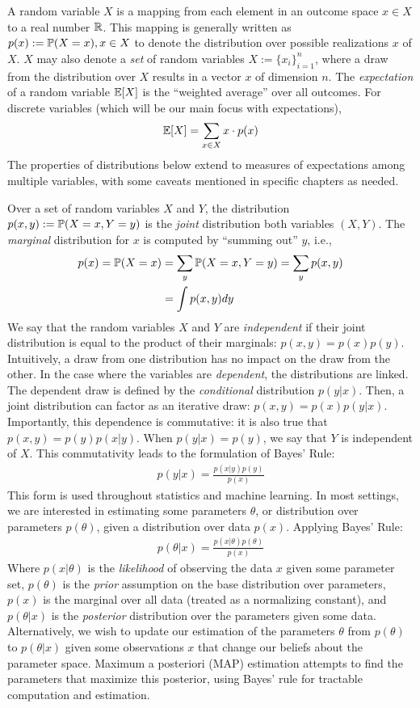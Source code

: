 
A random variable $X$ is a mapping from each element in an outcome space $x \in X$ to a real number $\mathbb{R}$. This mapping is generally written as $p(x):=\mathbb{P}(X=x), x \in X$ to denote the distribution over possible realizations $x$ of $X$. $X$ may also denote a \textit{set} of random variables $X:=\{x_i\}_{i=1}^n$, where a draw from the distribution over $X$ results in a vector $x$ of dimension $n$.
The \textit{expectation} of a random variable $\mathbb{E}[X]$ is the ``weighted average'' over all outcomes. For discrete variables (which will be our main focus with expectations), 
\begin{align}
\mathbb{E}[X] = \sum_{x\in X} x\cdot p(x)
\end{align}
The properties of distributions below extend to measures of expectations among multiple variables, with some caveats mentioned in specific chapters as needed.

Over a set of random variables $X$ and $Y$, the distribution $p(x,y):= \mathbb{P}(X=x,Y=y)$ is the \textit{joint} distribution both variables $(X,Y)$. The \textit{marginal} distribution for $x$ is computed by ``summing out'' $y$, i.e.,
\begin{align}
p(x) = \mathbb{P}(X=x) &= \sum_y \mathbb{P}(X=x,Y=y) = \sum_y p(x,y) \\
&= \int p(x,y) dy
\end{align}
We say that the random variables $X$ and $Y$ are \textit{independent} if their joint distribution is equal to the product of their marginals: $p(x,y) = p(x)p(y)$.
Intuitively, a draw from one distribution has no impact on the draw from the other. In the case where the variables are \textit{dependent}, the distributions are linked. The dependent draw is defined by the \textit{conditional} distribution $p(y|x)$. Then, a joint distribution can factor as an iterative draw: $p(x,y) = p(x)p(y|x)$. Importantly, this dependence is commutative: it is also true that $p(x,y) = p(y)p(x|y)$. When $p(y|x) = p(y)$, we say that $Y$ is independent of $X$. This commutativity leads to the formulation of Bayes' Rule:
\begin{align}
    p(y|x) = \frac{p(x|y)p(y)}{p(x)}
\end{align}
This form is used throughout statistics and machine learning. In most settings, we are interested in estimating some parameters $\theta$, or distribution over parameters $p(\theta)$, given a distribution over data $p(x)$. Applying Bayes' Rule:
\begin{align}
    p(\theta|x) = \frac{p(x|\theta)p(\theta)}{p(x)}
\end{align}
Where $p(x|\theta)$ is the \textit{likelihood} of observing the data $x$ given some parameter set, $p(\theta)$ is the \textit{prior} assumption on the base distribution over parameters, $p(x)$ is the marginal over all data (treated as a normalizing constant), and $p(\theta|x)$ is the \textit{posterior} distribution over the parameters given some data.
Alternatively, we wish to update our estimation of the parameters $\theta$ from $p(\theta)$ to $p(\theta|x)$ given some observations $x$ that change our beliefs about the parameter space.
Maximum a posteriori (MAP) estimation attempts to find the parameters that maximize this posterior, using Bayes' rule for tractable computation and estimation.

